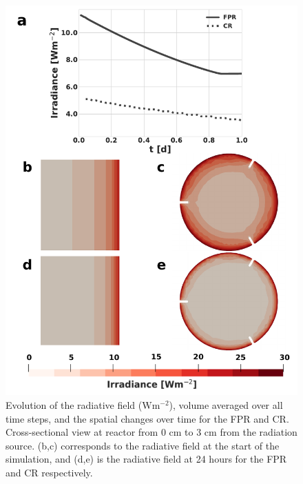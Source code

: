 \begin{figure}[tp]
\centering
\includegraphics[scale=0.75]{Images/Chap3/rad_field_dynamics.pdf}
\caption{Evolution of the radiative field ($\mathrm{W m^{-2}}$), volume averaged over all time steps, and the spatial changes over time for the FPR and CR. Cross-sectional view at reactor from 0 cm to 3 cm from the radiation source. (b,c) corresponds to the radiative field at the start of the simulation, and (d,e) is the radiative field at 24 hours for the FPR and CR respectively.}
\label{fig:rad_evol}
\end{figure}

